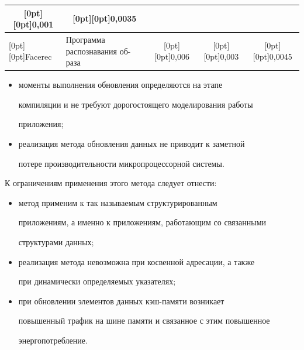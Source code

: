 \begin{table}
\begin{center}
\begin{tabular}{|l|p{48.5mm}|c|c|c|}
\multicolumn{1}{c|}{\raisebox{-18pt}[0pt][0pt]{0,001}}&

\multicolumn{1}{c|}{\raisebox{-18pt}[0pt][0pt]{0,0035}}\\

\hline

\multicolumn{1}{|l|}{\raisebox{-6pt}[0pt][0pt]{Facerec}}&Программа распознавания об-\linebreak раза&

\multicolumn{1}{c|}{\raisebox{-6pt}[0pt][0pt]{0,006}}&

\multicolumn{1}{c|}{\raisebox{-6pt}[0pt][0pt]{0,003}}&

\multicolumn{1}{c|}{\raisebox{-6pt}[0pt][0pt]{0,0045}}\\

\hline

\end{tabular}

\end{center}

\end{table}



\noindent

    \begin{itemize}

\item моменты выполнения обновления определяются на этапе 

компиляции и не требуют дорогостоящего моделирования работы 

приложения;

\item реализация метода обновления данных не приводит к заметной 

потере производительности микропроцессорной системы. 

\end{itemize}



    К ограничениям применения этого метода следует отнести:

    \begin{itemize}

\item метод применим к так называемым структурированным 

приложениям, а именно к приложениям, работающим со связанными 

структурами данных; 

\item реализация метода невозможна при косвенной адресации, а также 

при динамически определяемых указателях; 

\item при обновлении элементов данных кэш-памяти возникает 

повышенный трафик на шине памяти и связанное с этим повышенное 

энергопотребление.

\end{itemize}



